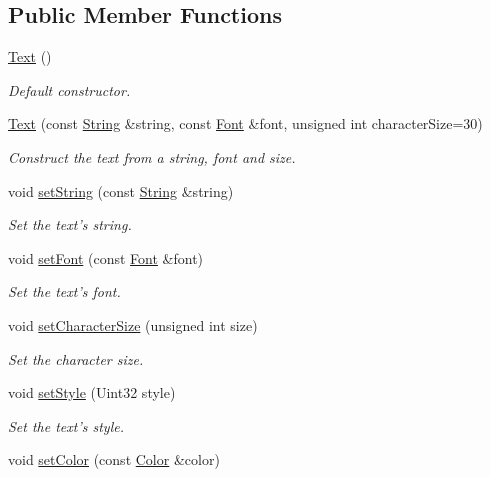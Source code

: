 \subsection*{Public Member Functions}
\begin{DoxyCompactItemize}
\item 
\hyperlink{classsf_1_1Text_aff7cab6a92e5948c9d1481cb2d87eb84}{Text} ()
\begin{DoxyCompactList}\small\item\em Default constructor. \end{DoxyCompactList}\item 
\hyperlink{classsf_1_1Text_a614019e0b5c0ed39a99d32483a51f2c5}{Text} (const \hyperlink{classsf_1_1String}{String} \&string, const \hyperlink{classsf_1_1Font}{Font} \&font, unsigned int character\-Size=30)
\begin{DoxyCompactList}\small\item\em Construct the text from a string, font and size. \end{DoxyCompactList}\item 
void \hyperlink{classsf_1_1Text_a7d3b3359f286fd9503d1ced25b7b6c33}{set\-String} (const \hyperlink{classsf_1_1String}{String} \&string)
\begin{DoxyCompactList}\small\item\em Set the text's string. \end{DoxyCompactList}\item 
void \hyperlink{classsf_1_1Text_a2927805d1ae92d57f15034ea34756b81}{set\-Font} (const \hyperlink{classsf_1_1Font}{Font} \&font)
\begin{DoxyCompactList}\small\item\em Set the text's font. \end{DoxyCompactList}\item 
void \hyperlink{classsf_1_1Text_ae96f835fc1bff858f8a23c5b01eaaf7e}{set\-Character\-Size} (unsigned int size)
\begin{DoxyCompactList}\small\item\em Set the character size. \end{DoxyCompactList}\item 
void \hyperlink{classsf_1_1Text_ad791702bc2d1b6590a1719aa60635edf}{set\-Style} (Uint32 style)
\begin{DoxyCompactList}\small\item\em Set the text's style. \end{DoxyCompactList}\item 
void \hyperlink{classsf_1_1Text_afd1742fca1adb6b0ea98357250ffb634}{set\-Color} (const \hyperlink{classsf_1_1Color}{Color} \&color)

\end{DoxyCompactItemize}
